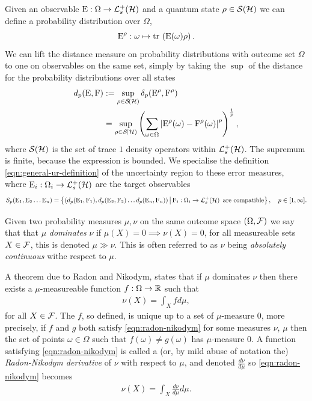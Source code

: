 Given an observable $\ope:\Omega\to\posops[\hcal]$ and a quantum state $\rho\in\dops[\hcal]$ we can define a probability distribution over $\Omega$,
\begin{equation}
  \ope^\rho:\omega \mapsto \tr{\ope(\omega)\rho}.
\end{equation}
We can lift the distance measure on probability distributions with outcome set $\Omega$ to one on observables on the same set, simply by taking the $\sup$ of the distance for the probability distributions over all states
\begin{align}
  d_p(\ope, \opf) &\defeq \sup_{\rho\in\dops[\hcal]} \delta_p(\ope^\rho, \opf^\rho)\\
                  &= \sup_{\rho\in\dops[\hcal]} \left(\sum_{\omega\in\Omega}\abs{\ope^\rho(\omega) - \opf^\rho(\omega)}^p\right)^{\frac{1}{p}},
\end{align}
where $\dops[\hcal]$ is the set of trace $1$ density operators within $\posops[\hcal]$. The supremum is finite, because the expression is bounded. We specialise the definition \eqref{eqn:general-ur-definition} of the uncertainty region to these error measures, where $\ope_i:\Omega_i\to\posops[\hcal]$ are the target observables
\begin{equation}
  S_p(\ope_1, \ope_2\hdots \ope_n) = \sbuild{(d_p(\ope_1, \opf_1), d_p(\ope_2, \opf_2)\hdots d_p(\ope_n, \opf_n))}{\opf_i:\Omega_i\to\posops[\hcal] \text{ are compatible}},\quad p\in [1,\infty].
\end{equation}

Given two probability measures $\mu,\nu$ on the same outcome space $(\Omega, \mathcal{F})$ we say that that $\mu$ \emph{dominates} $\nu$ if $\mu(X) = 0\implies\nu(X) = 0$, for all measureable sets $X\in\mathcal{F}$, this is denoted $\mu\gg\nu$. This is often referred to as $\nu$ being \emph{absolutely continuous} withe respect to $\mu$.

A theorem due to Radon and Nikodym, \cites{billingsley-prob-and-measure}{Nikodym1930} states that if $\mu$ dominates $\nu$ then there exists a $\mu$-measureable function $f:\Omega\to \mathbb{R}$ such that 
\begin{align}\label{eqn:radon-nikodym}
  \nu(X) = \int_X f d\mu,
\end{align}
for all $X\in\mathcal{F}$. The $f$, so defined, is unique up to a set of $\mu$-measure $0$, more precisely, if $f$ and $g$ both satisfy \eqref{eqn:radon-nikodym} for some measures $\nu$, $\mu$ then the set of points $\omega\in\Omega$ such that $f(\omega)\neq g(\omega)$ has $\mu$-measure $0$. A function satisfying \eqref{eqn:radon-nikodym} is called a (or, by mild abuse of notation the) \emph{Radon-Nikodym derivative} of $\nu$ with respect to $\mu$, and denoted $\frac{d\nu}{d\mu}$ so \eqref{eqn:radon-nikodym} becomes
\begin{align}\label{eqn:radon-nikodym-2}
  \nu(X) = \int_X \frac{d\nu}{d\mu} d\mu.
\end{align}

